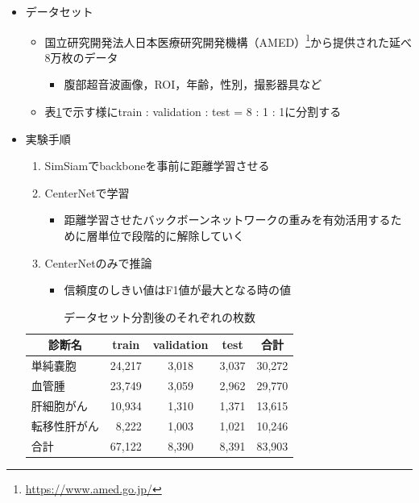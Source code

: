 \documentclass{ujarticle}
\newcommand{\Tref}[1]{\mbox{表\ref{tab:#1}}}
\begin{document}
        \begin{itemize}
            \item データセット
            \begin{itemize}
                \item 国立研究開発法人日本医療研究開発機構（AMED）\footnote{\url{https://www.amed.go.jp/}}から提供された延べ8万枚のデータ
                \begin{itemize}
                    \item 腹部超音波画像，ROI，年齢，性別，撮影器具など
                \end{itemize}
                \item \Tref{dataset}で示す様にtrain : validation : test = 8 : 1 : 1に分割する
            \end{itemize}
        \end{itemize}
        \begin{itemize}
            \item 実験手順
            \begin{enumerate}
                \item SimSiamでbackboneを事前に距離学習させる
                \item CenterNetで学習
                \begin{itemize}
                    \item 距離学習させたバックボーンネットワークの重みを有効活用するために層単位で段階的に解除していく
                \end{itemize}
                \item CenterNetのみで推論
                \begin{itemize}
                    \item 信頼度のしきい値はF1値が最大となる時の値
                \end{itemize}
            \end{enumerate}

            \begin{table}[t]
                \centering
                \caption{データセット分割後のそれぞれの枚数}
                \label{tab:dataset}
                    \begin{tabular}{l|rcr|c} \hline
                        \multicolumn{1}{c|}{診断名} & \multicolumn{1}{c}{train} & validation & \multicolumn{1}{c|}{test} & 合計 \\ \hline
                        単純嚢胞 & 24,217 & 3,018 & 3,037 & 30,272 \\
                        血管腫 & 23,749 & 3,059 & 2,962 & 29,770 \\
                        肝細胞がん & 10,934 & 1,310 & 1,371 & 13,615 \\
                        転移性肝がん & 8,222 & 1,003 & 1,021 & 10,246 \\ \hline
                        合計 & 67,122 & 8,390 & 8,391 & 83,903 \\ \hline
                    \end{tabular}
            \end{table}
        \end{itemize}
\end{document}
